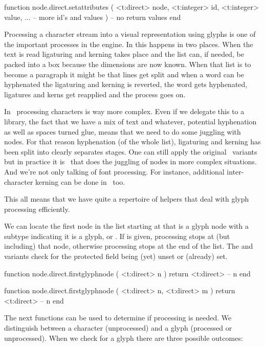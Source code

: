 function node.direct.setattributes (
    <t:direct>  node,
    <t:integer> id,
    <t:integer> value,
    ...                -- more id's and values
)
    -- no return values
end
\stoptyping

\stopsubsection

\startsubsection[title={Glyph handling}]

Processing a character stream into a visual representation using glyphs is one of
the important processes in the engine. In  this happens in two places. When
the text is read ligaturing and kerning takes place and the list can, if needed,
be packed into a box because the dimensions are now known. When that list is to
become a paragraph it might be that lines get split and when a word can be
hyphenated the ligaturing and kerning is reverted, the word gets hyphenated,
ligatures and kerns get reapplied and the process goes on.

In \OPENTYPE\ processing characters is way more complex. Even if we delegate this
to a library, the fact that we have a mix of text and whatever, potential
hyphenation as well as spaces turned glue, means that we need to do some juggling
with nodes. For that reason hyphenation (of the whole list), ligaturing and
kerning has been split into clearly separates stages. One can still apply the
original \TEX\ variants but in practice it is \LUA\ that does the juggling of
nodes in more complex situations. And we're not only talking of font processing.
For instance, additional inter-character kerning can be done in \LUA\ too.

This all means that we have quite a repertoire of helpers that deal with glyph
processing efficiently.

We can locate the first node in the list starting at  that is a glyph node
with a subtype indicating it is a glyph, or . If  is given,
processing stops at (but including) that node, otherwise processing stops at the
end of the list. The  and  variants check for the
protected field being (yet) unset or (already) set.

\starttyping[option=LUA]
function node.direct.firstglyphnode ( <t:direct> n )
    return <t:direct> -- n
end

function node.direct.firstglyphnode ( <t:direct> n, <t:direct> m )
    return <t:direct> -- n
end
\stoptyping

The next functions can be used to determine if processing is needed. We distinguish between
a character (unprocessed) and a glyph (processed or unprocessed). When we check for a glyph
there are three possible outcomes:

